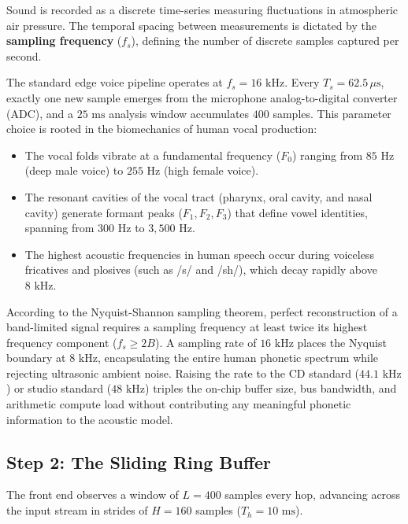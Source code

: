 \documentclass[11pt,a4paper]{article}
\begin{document}
Sound is recorded as a discrete time-series measuring fluctuations in atmospheric air pressure. The temporal spacing between measurements is dictated by the \textbf{sampling frequency} ($f_s$), defining the number of discrete samples captured per second.

The standard edge voice pipeline operates at $f_s = 16\text{ kHz}$. Every $T_s = 62.5\,\mu\text{s}$, exactly one new sample emerges from the microphone analog-to-digital converter (ADC), and a $25\text{ ms}$ analysis window accumulates $400$ samples. This parameter choice is rooted in the biomechanics of human vocal production:
\begin{itemize}\setlength{\itemsep}{-1pt}\setlength{\parsep}{0pt}\setlength{\topsep}{0.5pt}\setlength{\partopsep}{0pt}
    \item The vocal folds vibrate at a fundamental frequency ($F_0$) ranging from $85\text{ Hz}$ (deep male voice) to $255\text{ Hz}$ (high female voice).
    \item The resonant cavities of the vocal tract (pharynx, oral cavity, and nasal cavity) generate formant peaks ($F_1, F_2, F_3$) that define vowel identities, spanning from $300\text{ Hz}$ to $3{,}500\text{ Hz}$.
    \item The highest acoustic frequencies in human speech occur during voiceless fricatives and plosives (such as /s/ and /sh/), which decay rapidly above $8\text{ kHz}$.
\end{itemize}

According to the Nyquist-Shannon sampling theorem, perfect reconstruction of a band-limited signal requires a sampling frequency at least twice its highest frequency component ($f_s \ge 2B$). A sampling rate of $16\text{ kHz}$ places the Nyquist boundary at $8\text{ kHz}$, encapsulating the entire human phonetic spectrum while rejecting ultrasonic ambient noise. Raising the rate to the CD standard ($44.1\text{ kHz}$) or studio standard ($48\text{ kHz}$) triples the on-chip buffer size, bus bandwidth, and arithmetic compute load without contributing any meaningful phonetic information to the acoustic model.

\clearpage

\subsection*{Step 2: The Sliding Ring Buffer}

The front end observes a window of $L = 400$ samples every hop, advancing across the input stream in strides of $H = 160$ samples ($T_h = 10\text{ ms}$).
\end{document}
